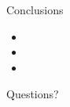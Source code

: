 

\begin{frame}{Conclusions}
  \begin{itemize}
    \item {}
    \item {}
    \item {}
  \end{itemize}
\end{frame}

\begin{frame}[standout]
  Questions?
\end{frame}
